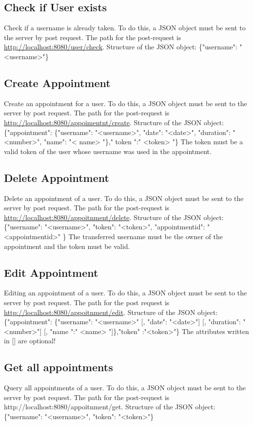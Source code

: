 \documentclass[12pt]{scrartcl}
\begin{document}
    \subsection{Check if User exists}
        Check if a username is already taken.
        To do this, a JSON object must be sent to the server by post request. The path for the post-request is
        \url{http://localhost:8080/user/check}.
        Structure of the JSON object: \{"username": "<username>"\}

    \subsection{Create Appointment}
        Create an appointment for a user.
        To do this, a JSON object must be sent to the server by post request. The path for the post-request is
        \url{http://localhost:8080/appoimentnt/create}.
        Structure of the JSON object: \{"appointment": \{"username": "<username>", "date": "<date>", "duration": "<number>", "name": "< name> "\}," token ":" <token> "\}
        The token must be a valid token of the user whose username was used in the appointment.

    \subsection{Delete Appointment}
        Delete an appointment of a user.
        To do this, a JSON object must be sent to the server by post request. The path for the post-request is
        \url{http://localhost:8080/appoitnment/delete}.
        Structure of the JSON object: \{"username": "<username>", "token": "<token>", "appointmentid": "<appointmentid>" \}
        The transferred username must be the owner of the appointment and the token must be valid.

    \subsection{Edit Appointment}
        Editing an appointment of a user.
        To do this, a JSON object must be sent to the server by post request. The path for the post request is \url{http://localhost:8080/appoitnment/edit}.
        Structure of the JSON object: \{"appointment": \{"username": "<username>" [, "date": "<date>"] [, "duration": "<number>"] [, "name ":" <name> "]\},"token" :"<token>"\}
        The attributes written in {[]} are optional!
    

    \subsection{Get all appointments}
        Query all appointments of a user.
        To do this, a JSON object must be sent to the server by post request. The path for the post-request is
        http://localhost:8080/appoitnment/get.
        Structure of the JSON object: \{"username": "<username>", "token": "<token>"\}
\end{document}
